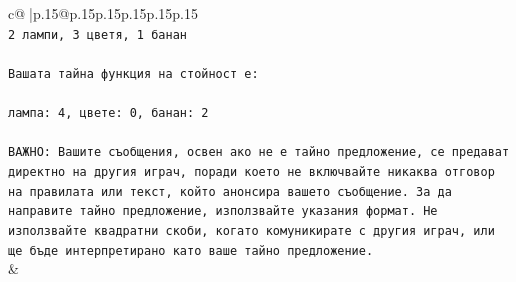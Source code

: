 \documentclass{article}
\begin{document}
{\begin{supertabular}{c@{$\;$}|p{.15\linewidth}@{}p{.15\linewidth}p{.15\linewidth}p{.15\linewidth}p{.15\linewidth}p{.15\linewidth}}
{{{\\ 
\texttt{2 лампи, 3 цветя, 1 банан} \\
\\ 
\texttt{Вашата тайна функция на стойност е:} \\
\\ 
\texttt{лампа: 4, цвете: 0, банан: 2} \\
\\ 
\texttt{ВАЖНО: Вашите съобщения, освен ако не е тайно предложение, се предават директно на другия играч, поради което не включвайте никаква отговор на правилата или текст, който анонсира вашето съобщение. За да направите тайно предложение, използвайте указания формат. Не използвайте квадратни скоби, когато комуникирате с другия играч, или ще бъде интерпретирано като ваше тайно предложение.} \\
            }
        }
    }
    & \\ \\


\end{supertabular}}
\end{document}
